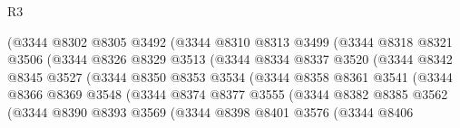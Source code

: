 \begin{lexlean}{R3}
\begin{coremodule}
                            (@3344
                              @8302
                              @8305
                              @3492
                              (@3344
                                @8310
                                @8313
                                @3499
                                (@3344
                                  @8318
                                  @8321
                                  @3506
                                  (@3344
                                    @8326
                                    @8329
                                    @3513
                                    (@3344
                                      @8334
                                      @8337
                                      @3520
                                      (@3344
                                        @8342
                                        @8345
                                        @3527
                                        (@3344
                                          @8350
                                          @8353
                                          @3534
                                          (@3344
                                            @8358
                                            @8361
                                            @3541
                                            (@3344
                                              @8366
                                              @8369
                                              @3548
                                              (@3344
                                                @8374
                                                @8377
                                                @3555
                                                (@3344
                                                  @8382
                                                  @8385
                                                  @3562
                                                  (@3344
                                                    @8390
                                                    @8393
                                                    @3569
                                                    (@3344
                                                      @8398
                                                      @8401
                                                      @3576
                                                      (@3344
                                                        @8406

\end{coremodule}
\end{lexlean}
